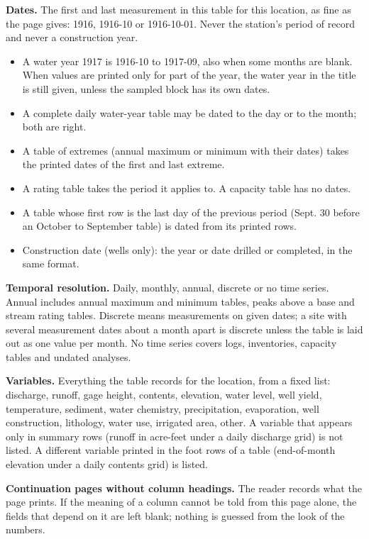 \textbf{Dates.} The first and last measurement in this table for this location, as fine as the page gives: 1916, 1916-10 or 1916-10-01. Never the station's period of record and never a construction year.

\begin{itemize}
  \item A water year 1917 is 1916-10 to 1917-09, also when some months are blank. When values are printed only for part of the year, the water year in the title is still given, unless the sampled block has its own dates.
  \item A complete daily water-year table may be dated to the day or to the month; both are right.
  \item A table of extremes (annual maximum or minimum with their dates) takes the printed dates of the first and last extreme.
  \item A rating table takes the period it applies to. A capacity table has no dates.
  \item A table whose first row is the last day of the previous period (Sept. 30 before an October to September table) is dated from its printed rows.
  \item Construction date (wells only): the year or date drilled or completed, in the same format.
\end{itemize}

\textbf{Temporal resolution.} Daily, monthly, annual, discrete or no time series. Annual includes annual maximum and minimum tables, peaks above a base and stream rating tables. Discrete means measurements on given dates; a site with several measurement dates about a month apart is discrete unless the table is laid out as one value per month. No time series covers logs, inventories, capacity tables and undated analyses.

\textbf{Variables.} Everything the table records for the location, from a fixed list: discharge, runoff, gage height, contents, elevation, water level, well yield, temperature, sediment, water chemistry, precipitation, evaporation, well construction, lithology, water use, irrigated area, other. A variable that appears only in summary rows (runoff in acre-feet under a daily discharge grid) is not listed. A different variable printed in the foot rows of a table (end-of-month elevation under a daily contents grid) is listed.

\textbf{Continuation pages without column headings.} The reader records what the page prints. If the meaning of a column cannot be told from this page alone, the fields that depend on it are left blank; nothing is guessed from the look of the numbers.

